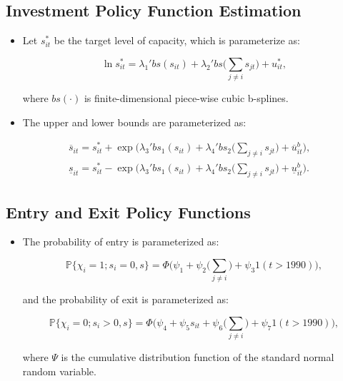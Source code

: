 \documentclass[]{book}
\providecommand{\tightlist}{%
  \setlength{\itemsep}{0pt}\setlength{\parskip}{0pt}}
\begin{document}
\subsection{Investment Policy Function
Estimation}\label{investment-policy-function-estimation-1}

\begin{itemize}
\tightlist
\item
  Let \(s_{it}^*\) be the target level of capacity, which is
  parameterize as:

  \begin{equation}
  \ln s_{it}^* = \lambda_1' bs(s_{it}) + \lambda_2' bs \Bigg(\sum_{j \neq i} s_{jt}\Bigg) + u_{it}^*,
  \end{equation}

  where \(bs(\cdot)\) is finite-dimensional piece-wise cubic b-splines.
\item
  The upper and lower bounds are parameterized as:
\end{itemize}

\begin{equation}
\begin{split}
&\overline{s}_{it} = s_{it}^* + \exp\Bigg(\lambda_3' bs_1(s_{it}) + \lambda_4' bs_2\Bigg(\sum_{j \neq i} s_{jt} \Bigg) + \overline{u}_{it}^b \Bigg),\\
&\underline{s}_{it} = s_{it}^* - \exp\Bigg(\lambda_3' bs_1(s_{it}) + \lambda_4' bs_2\Bigg(\sum_{j \neq i} s_{jt} \Bigg) + \underline{u}_{it}^b \Bigg).
\end{split}
\end{equation}

\subsection{Entry and Exit Policy
Functions}\label{entry-and-exit-policy-functions}

\begin{itemize}
\tightlist
\item
  The probability of entry is parameterized as:

  \begin{equation}
  \mathbb{P}\{\chi_i = 1; s_i = 0, s\} = \Phi\Bigg(\psi_1 + \psi_2\Bigg(\sum_{j \neq i}\Bigg) + \psi_3 1(t > 1990) \Bigg),
  \end{equation}

  and the probability of exit is parameterized as:

  \begin{equation}
  \mathbb{P}\{\chi_i = 0; s_i > 0, s\} = \Phi\Bigg(\psi_4 + \psi_5 s_{it} + \psi_6 \Bigg(\sum_{j \neq i}\Bigg) + \psi_7 1(t > 1990) \Bigg),
  \end{equation}

  where \(\Psi\) is the cumulative distribution function of the standard
  normal random variable.
\end{itemize}
\end{document}
